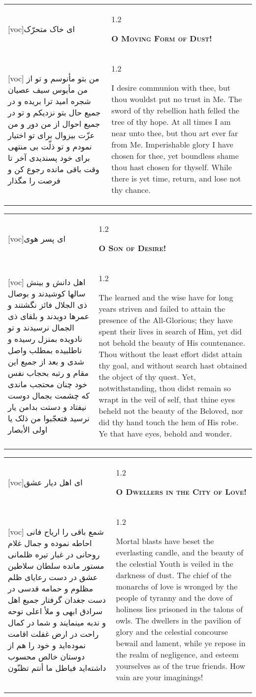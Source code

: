 \documentclass[11pt]{article}
\makeatletter
\newenvironment{orig}
  {\begin{farsi}[voc]}
  {\end{farsi}}
\newenvironment{trans}
  {\Large\begin{spacing}{1.2}\raggedright}
  {\end{spacing}}
\newenvironment{word}
  {\begin{tabular}[t]{p{2.75in}@{\hspace{3em}}p{2.75in}}}
  {\end{tabular}}
\newcommand{\ayat}[2]{\begin{orig}#1\end{orig} & \begin{trans}#2\end{trans}}
\newcommand{\heading}[2]{\textsc{\textbf{#1}} %
}
\makeatother
\begin{document}
\pagebreak

\begin{word}
\ayat{ای خاک متحرّک}{\heading{O Moving Form of Dust!}{}} \\ \ayat{
من بتو مأنوسم و تو از من مأيوس
سيف عصيان شجره اميد ترا بريده
و در جميع حال بتو نزديکم و تو در جميع احوال از من دور
و من عزّت بيزوال برای تو اختيار نمودم و تو ذلّت بی منتهی برای خود پسنديدی
آخر تا وقت باقی مانده رجوع کن و فرصت را مگذار
}{
  I desire communion with thee, but thou wouldst put no trust in Me. The sword
  of thy rebellion hath felled the tree of thy hope. At all times I am near
  unto thee, but thou art ever far from Me. Imperishable glory I have chosen
  for thee, yet boundless shame thou hast chosen for thyself. While there is
  yet time, return, and lose not thy chance.
}
\end{word}

\pagebreak

\begin{word}
\ayat{ای پسر هوی}{\heading{O Son of Desire!}{}} \\ \ayat{
اهل دانش و بينش سالها کوشيدند و بوصال ذی الجلال فائز نگشتند و عمرها دويدند و بلقای ذی الجمال نرسيدند
و تو نادويده بمنزل رسيده و ناطلبيده بمطلب واصل شدی
و بعد از جميع اين مقام و رتبه بحجاب نفس خود چنان محتجب ماندی که چشمت بجمال دوست نيفتاد و دستت بدامن يار نرسيد
فتعجّبوا من ذلک يا اولی الأبصار
}{
  The learned and the wise have for long years striven and failed to attain
  the presence of the All-Glorious; they have spent their lives in search of
  Him, yet did not behold the beauty of His countenance. Thou without the
  least effort didst attain thy goal, and without search hast obtained the
  object of thy quest. Yet, notwithstanding, thou didst remain so wrapt in the
  veil of self, that thine eyes beheld not the beauty of the Beloved, nor did
  thy hand touch the hem of His robe. Ye that have eyes, behold and wonder.
}
\end{word}

\pagebreak

\begin{word}
\ayat{ای اهل ديار عشق}{\heading{O Dwellers in the City of Love!}{}} \\ \ayat{
شمع باقی را ارياح فانی احاطه نموده و جمال غلام روحانی در غبار تيره ظلمانی مستور مانده
سلطان سلاطين عشق در دست رعايای ظلم مظلوم و حمامه قدسی در دست جغدان گرفتار
جميع اهل سرادق ابهی و ملأ اعلی نوحه و ندبه مينمايند و شما در کمال راحت در ارض غفلت اقامت نموده‌ايد و خود را هم از دوستان خالص محسوب داشته‌ايد
فباطل ما أنتم تظنّون
}{
  Mortal blasts have beset the everlasting candle, and the beauty of the
  celestial Youth is veiled in the darkness of dust. The chief of the monarchs
  of love is wronged by the people of tyranny and the dove of holiness lies
  prisoned in the talons of owls. The dwellers in the pavilion of glory and
  the celestial concourse bewail and lament, while ye repose in the realm of
  negligence, and esteem yourselves as of the true friends. How vain are your
  imaginings!
}
\end{word}
\end{document}
